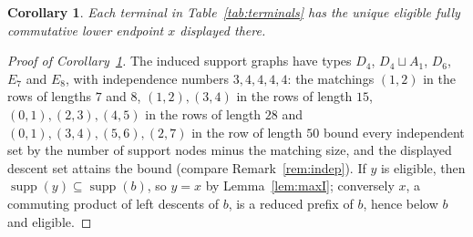 \documentclass[10pt]{article}
\newtheorem{corollary}[theorem]{Corollary}
\theoremstyle{remark}
\newcommand{\supp}{\operatorname{supp}}
\begin{document}
\begin{corollary}\label{cor:eligible}
Each terminal in Table~\ref{tab:terminals} has the unique eligible fully
commutative lower endpoint $x$ displayed there.
\end{corollary}
\begin{proof}[Proof of Corollary~\ref{cor:eligible}]
The induced support graphs have types $D_4$, $D_4\sqcup A_1$, $D_6$,
$E_7$ and $E_8$, with independence numbers $3,4,4,4,4$: the matchings
$(1,2)$ in the rows of lengths $7$ and $8$, $(1,2),(3,4)$ in the rows of
length $15$, $(0,1),(2,3),(4,5)$ in the rows of length $28$ and
$(0,1),(3,4),(5,6),(2,7)$ in the row of length $50$ bound every independent
set by the number of support nodes minus the matching size, and the
displayed descent set attains the bound (compare Remark~\ref{rem:indep}).
If $y$ is eligible, then $\supp(y)\subseteq\supp(b)$, so
$y=x$ by Lemma~\ref{lem:maxI}; conversely $x$, a commuting product of
left descents of $b$, is a reduced prefix of $b$, hence below $b$ and
eligible.
\end{proof}
\end{document}
